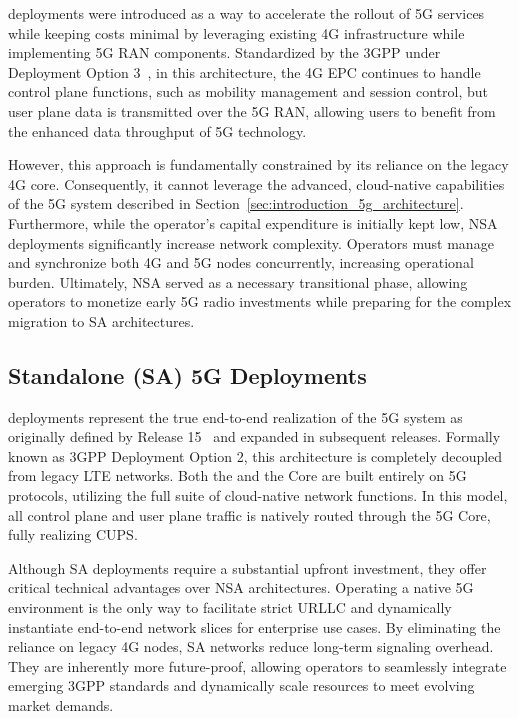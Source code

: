  deployments were introduced as a way to accelerate the rollout of 5G services while keeping costs minimal by leveraging existing 4G infrastructure while implementing 5G \gls{RAN} components. Standardized by the \gls{3GPP} under Deployment Option 3~\cite{3GPP38801}, in this architecture, the 4G \gls{EPC} continues to handle control plane functions, such as mobility management and session control, but user plane data is transmitted over the 5G \gls{RAN}, allowing users to benefit from the enhanced data throughput of 5G technology.

However, this approach is fundamentally constrained by its reliance on the legacy 4G core. Consequently, it cannot leverage the advanced, cloud-native capabilities of the 5G system described in Section~\ref{sec:introduction_5g_architecture}. Furthermore, while the operator's capital expenditure is initially kept low, \gls{NSA} deployments significantly increase network complexity. Operators must manage and synchronize both 4G and 5G nodes concurrently, increasing operational burden. Ultimately, \gls{NSA} served as a necessary transitional phase, allowing operators to monetize early 5G radio investments while preparing for the complex migration to \gls{SA} architectures.

\subsection{Standalone (SA) 5G Deployments}
\label{sec:sa_deployments}
 deployments represent the true end-to-end realization of the 5G system as originally defined by  Release 15~\cite{3GPPRelease15} and expanded in subsequent releases. Formally known as \gls{3GPP} Deployment Option 2, this architecture is completely decoupled from legacy \gls{LTE} networks. Both the  and the Core are built entirely on 5G protocols, utilizing the full suite of cloud-native network functions. In this model, all control plane and user plane traffic is natively routed through the 5G Core, fully realizing \gls{CUPS}.

Although \gls{SA} deployments require a substantial upfront investment, they offer critical technical advantages over \gls{NSA} architectures. Operating a native 5G environment is the only way to facilitate strict \gls{URLLC} and dynamically instantiate end-to-end network slices for enterprise use cases. By eliminating the reliance on legacy 4G nodes, \gls{SA} networks reduce long-term signaling overhead. They are inherently more future-proof, allowing operators to seamlessly integrate emerging \gls{3GPP} standards and dynamically scale resources to meet evolving market demands.

